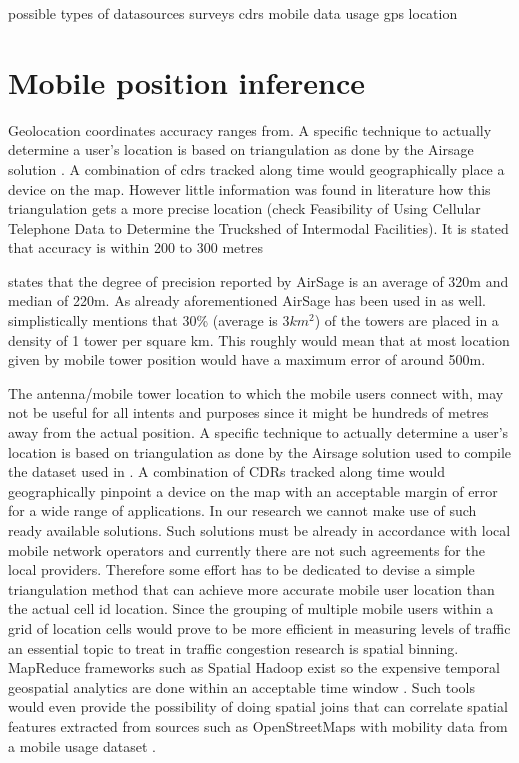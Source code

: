 \documentclass[12pt, a4paper]{report}
\theoremstyle{definition}
\theoremstyle{definition}%
\theoremstyle{definition}%
\theoremstyle{definition}%
\theoremstyle{definition}%
\theoremstyle{definition}%
\begin{document}
possible types of datasources
surveys
cdrs
mobile data usage
gps location



\section{Mobile position inference} \label{background_mobile_position_inference} 

Geolocation coordinates accuracy ranges from. A specific technique to actually determine a user's location is based on triangulation as done by the Airsage solution \cite{Hoteit2014}. A combination of cdrs tracked along time would geographically place a device on the map. However little information was found in literature how this triangulation gets a more precise location (check Feasibility of Using Cellular Telephone Data to Determine the Truckshed of Intermodal Facilities).  It is stated that accuracy is within 200 to 300 metres \cite{Colak2015}

\cite{Calabrese2013} states that the degree of precision reported by AirSage is an average of 320m and median of 220m. As already aforementioned AirSage has been used in \cite{Hoteit2014} as well. \cite{Gonzalez2008} simplistically mentions that 30\% (average is \(3km^{2}\)) of the towers are placed in a density of 1 tower per square km. This roughly would mean that at most location given by mobile tower position would have a maximum error of around 500m. 

The antenna/mobile tower location to which the mobile users connect with, may not be useful for all intents and purposes since it might be hundreds of metres away from the actual position. A specific technique to actually determine a user's location is based on triangulation as done by the Airsage solution used to compile the dataset used in \cite{Hoteit2014}. A combination of CDRs tracked along time would geographically pinpoint a device on the map with an acceptable margin of error for a wide range of applications. In our research we cannot make use of such ready available solutions. Such solutions must be already in accordance with local mobile network operators and currently there are not such agreements for the local providers. Therefore some effort has to be dedicated to devise a simple triangulation method that can achieve more accurate mobile user location than the actual cell id location. Since the grouping of multiple mobile users within a grid of location cells would prove to be more efficient in measuring levels of traffic an essential topic to treat in traffic congestion research is spatial binning. MapReduce frameworks such as Spatial Hadoop exist so the expensive temporal geospatial analytics are done within an acceptable time window \cite{Wu2014} \cite{Eldawy}. Such tools would even provide the possibility of doing spatial joins that can correlate spatial features extracted from sources such as OpenStreetMaps with mobility data from a mobile usage dataset \cite{Alarabi2014}.
\end{document}
